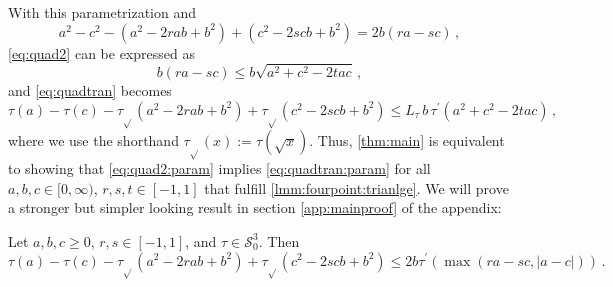 \documentclass{article}
\newcommand{\lb}{\left(} %
\newcommand{\rb}{\right)} %
\newcommand{\br}[1]{\lb #1 \rb} %
\newcommand{\brOf}[1]{\!\br{#1}} %
\newcommand*{\mc}[1]{\mathcal{#1}}
\newcommand{\Rp}{[0, \infty)} %
\newcommand{\pr}{^\prime}
\newcommand{\equationFullstop}{\, .}
\newcommand{\eqfs}{\equationFullstop}
\newcommand{\equationComma}{\, ,}
\newcommand{\eqcm}{\equationComma}
\newcommand{\tran}{\tau}
\newcommand{\trans}{\tran_{\!\sqrt{}}}
\newcommand{\dtran}{\tran\pr}
\newcommand{\ctransymbol}{L}
\newcommand{\ctrano}[1]{\ctransymbol_{#1}}
\newcommand{\ctran}{\ctrano{\tran}}
\newcommand{\setccod}[1]{\mc S_0^{#1}}
\begin{document}
%
With this parametrization and 
\begin{equation}\label{eq:quad2lhs:simplification}
	a^2 - c^2 - (a^2-2rab+b^2) + (c^2-2scb+b^2)
	= 2b \br{ra-sc}
	\eqcm
\end{equation}
\eqref{eq:quad2} can be expressed as
\begin{equation}\label{eq:quad2:param}
	b \br{ra-sc} \leq b \sqrt{a^2 + c^2 - 2tac}\eqcm
\end{equation}
 and \eqref{eq:quadtran} becomes
\begin{equation}\label{eq:quadtran:param}
	\tran(a) - \tran(c) - \trans\brOf{a^2-2rab+b^2} + \trans\brOf{c^2-2scb+b^2} \leq \ctran \, b \, \dtran(a^2 + c^2 - 2tac)\eqcm
\end{equation}
where we use the shorthand $\trans(x) := \tran(\sqrt x)$.
Thus, \cref{thm:main} is equivalent to showing that \eqref{eq:quad2:param} implies \eqref{eq:quadtran:param} for all $a,b,c\in\Rp$, $r,s,t\in[-1, 1]$ that fulfill \eqref{lmm:fourpoint:trianlge}. We will prove a stronger but simpler looking result in section \ref{app:mainproof} of the appendix:
%
\begin{theorem}\label{thm:main:param}
	Let $a,b,c\geq0$, $r,s\in[-1,1]$, and $\tran\in\setccod{3}$.
	Then
	\begin{equation}\label{eq:thm:main:param}
			\tran(a) - \tran(c) - \trans\brOf{a^2-2rab+b^2} + \trans\brOf{c^2-2scb+b^2}
			\leq 
			2 b \dtran\brOf{\max(ra - sc, |a-c|)}
		\eqfs
	\end{equation}
\end{theorem}
%
%
%
\end{document}
